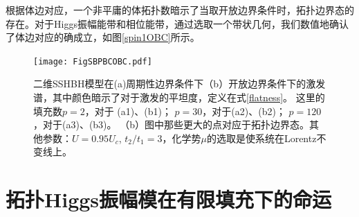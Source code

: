 根据体边对应，一个非平庸的体拓扑数暗示了当取开放边界条件时，拓扑边界态的存在。对于Higgs振幅能带和相位能带，通过选取一个带状几何，我们数值地确认了体边对应的确成立，如图\ref{spin1OBC}所示。

\begin{figure}
\centering
    \texttt{[image: FigSBPBCOBC.pdf]}
    \caption{二维SSHBH模型在(a)周期性边界条件下（b）开放边界条件下的激发谱，其中颜色暗示了对于激发的平坦度，定义在式\eqref{flatness}。
    这里的填充数$p=2$，对于 (a1)、(b1)；
    $p=30$，对于(a2)、(b2)；
    $p=120$，对于(a3)、(b3)。
    （b）图中那些更大的点对应于拓扑边界态。其他参数：$U=0.95 U_c$, $t_2/t_1=3$，化学势$\mu$的选取是使系统在Lorentz不变线上。}
    \label{pbcobc}
\end{figure}

\section{拓扑Higgs振幅模在有限填充下的命运}

